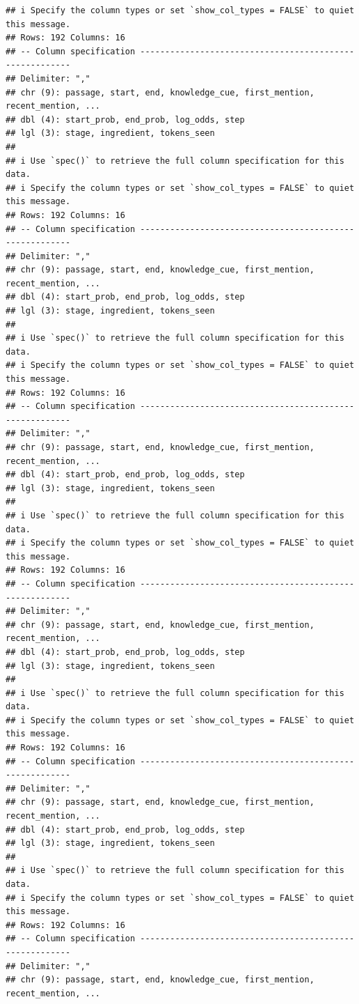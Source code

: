 \documentclass[
]{article}
\begin{document}
\begin{verbatim}
## i Specify the column types or set `show_col_types = FALSE` to quiet this message.
## Rows: 192 Columns: 16
## -- Column specification --------------------------------------------------------
## Delimiter: ","
## chr (9): passage, start, end, knowledge_cue, first_mention, recent_mention, ...
## dbl (4): start_prob, end_prob, log_odds, step
## lgl (3): stage, ingredient, tokens_seen
## 
## i Use `spec()` to retrieve the full column specification for this data.
## i Specify the column types or set `show_col_types = FALSE` to quiet this message.
## Rows: 192 Columns: 16
## -- Column specification --------------------------------------------------------
## Delimiter: ","
## chr (9): passage, start, end, knowledge_cue, first_mention, recent_mention, ...
## dbl (4): start_prob, end_prob, log_odds, step
## lgl (3): stage, ingredient, tokens_seen
## 
## i Use `spec()` to retrieve the full column specification for this data.
## i Specify the column types or set `show_col_types = FALSE` to quiet this message.
## Rows: 192 Columns: 16
## -- Column specification --------------------------------------------------------
## Delimiter: ","
## chr (9): passage, start, end, knowledge_cue, first_mention, recent_mention, ...
## dbl (4): start_prob, end_prob, log_odds, step
## lgl (3): stage, ingredient, tokens_seen
## 
## i Use `spec()` to retrieve the full column specification for this data.
## i Specify the column types or set `show_col_types = FALSE` to quiet this message.
## Rows: 192 Columns: 16
## -- Column specification --------------------------------------------------------
## Delimiter: ","
## chr (9): passage, start, end, knowledge_cue, first_mention, recent_mention, ...
## dbl (4): start_prob, end_prob, log_odds, step
## lgl (3): stage, ingredient, tokens_seen
## 
## i Use `spec()` to retrieve the full column specification for this data.
## i Specify the column types or set `show_col_types = FALSE` to quiet this message.
## Rows: 192 Columns: 16
## -- Column specification --------------------------------------------------------
## Delimiter: ","
## chr (9): passage, start, end, knowledge_cue, first_mention, recent_mention, ...
## dbl (4): start_prob, end_prob, log_odds, step
## lgl (3): stage, ingredient, tokens_seen
## 
## i Use `spec()` to retrieve the full column specification for this data.
## i Specify the column types or set `show_col_types = FALSE` to quiet this message.
## Rows: 192 Columns: 16
## -- Column specification --------------------------------------------------------
## Delimiter: ","
## chr (9): passage, start, end, knowledge_cue, first_mention, recent_mention, ...

\end{verbatim}
\end{document}
